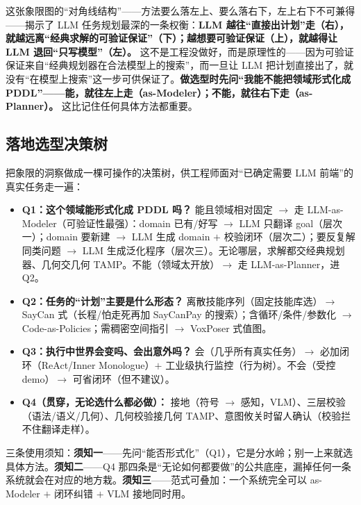 \begin{insight}
这张象限图的“对角线结构”——方法要么落左上、要么落右下，左上右下不可兼得——揭示了 LLM 任务规划最深的一条权衡：\textbf{LLM 越往“直接出计划”走（右），就越远离“经典求解的可验证保证”（下）；越想要可验证保证（上），就越得让 LLM 退回“只写模型”（左）。} 这不是工程没做好，而是原理性的——因为可验证保证来自“经典规划器在合法模型上的搜索”，而一旦让 LLM 把计划直接出了，就没有“在模型上搜索”这一步可供保证了。\textbf{做选型时先问“我能不能把领域形式化成 PDDL”——能，就往左上走（as-Modeler）；不能，就往右下走（as-Planner）。} 这比记住任何具体方法都重要。
\end{insight}

\subsection{落地选型决策树}
\label{sec:map-decision}

把象限的洞察做成一棵可操作的决策树，供工程师面对“已确定需要 LLM 前端”的真实任务走一遍：

\begin{itemize}
  \item \textbf{Q1：这个领域能形式化成 PDDL 吗？} 能且领域相对固定 $\to$ 走 LLM-as-Modeler（可验证性最强）：domain 已有/好写 $\to$ LLM 只翻译 goal（层次一）；domain 要新建 $\to$ LLM 生成 domain $+$ 校验闭环（层次二）；要反复解同类问题 $\to$ LLM 生成泛化程序（层次三）。无论哪层，求解都交经典规划器、几何交几何 TAMP。不能（领域太开放）$\to$ 走 LLM-as-Planner，进 Q2。
  \item \textbf{Q2：任务的“计划”主要是什么形态？} 离散技能序列（固定技能库选）$\to$ SayCan 式（长程/怕走死再加 SayCanPay 的搜索）；含循环/条件/参数化 $\to$ Code-as-Policies；需稠密空间指引 $\to$ VoxPoser 式值图。
  \item \textbf{Q3：执行中世界会变吗、会出意外吗？} 会（几乎所有真实任务）$\to$ 必加闭环（ReAct/Inner Monologue）$+$ 工业级执行监控（行为树）。不会（受控 demo）$\to$ 可省闭环（但不建议）。
  \item \textbf{Q4（贯穿，无论选什么都必做）：} 接地（符号 $\to$ 感知，VLM）、三层校验（语法/语义/几何）、几何校验接几何 TAMP、意图攸关时留人确认（校验拦不住翻译走样）。
\end{itemize}

\noindent 三条使用须知：\textbf{须知一}——先问“能否形式化”（Q1），它是分水岭；别一上来就选具体方法。\textbf{须知二}——Q4 那四条是“无论如何都要做”的公共底座，漏掉任何一条系统就会在对应的地方栽。\textbf{须知三}——范式可叠加：一个系统完全可以 as-Modeler $+$ 闭环纠错 $+$ VLM 接地同时用。

